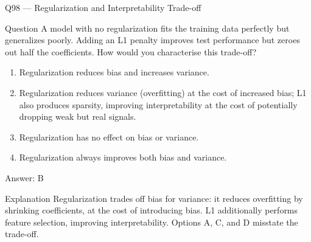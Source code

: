\documentclass[aspectratio=169,8pt]{beamer}
\begin{document}
\begin{frame}{Q98 --- Regularization and Interpretability Trade-off}
\begin{block}{Question}
A model with no regularization fits the training data perfectly but generalizes poorly. Adding an L1 penalty improves test performance but zeroes out half the coefficients. How would you characterise this trade-off?
\end{block}
\begin{enumerate}
\item Regularization reduces bias and increases variance.
\item Regularization reduces variance (overfitting) at the cost of increased bias; L1 also produces sparsity, improving interpretability at the cost of potentially dropping weak but real signals.
\item Regularization has no effect on bias or variance.
\item Regularization always improves both bias and variance.
\end{enumerate}
\begin{exampleblock}{Answer: B}\end{exampleblock}
\begin{block}{Explanation}
Regularization trades off bias for variance: it reduces overfitting by shrinking coefficients, at the cost of introducing bias. L1 additionally performs feature selection, improving interpretability. Options A, C, and D misstate the trade-off.
\end{block}
\end{frame}
\end{document}
